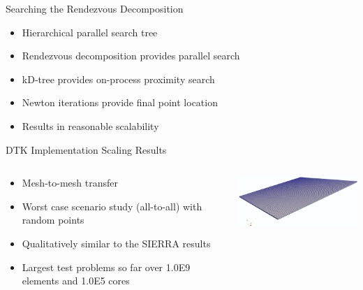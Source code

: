 \documentclass{beamer}
\begin{document}
\begin{frame}{Searching the Rendezvous Decomposition}
  
  \begin{itemize}
  \item Hierarchical parallel search tree
    \medskip
  \item Rendezvous decomposition provides parallel search
    \medskip
  \item kD-tree provides on-process proximity search
    \medskip
  \item Newton iterations provide final point location
    \medskip
  \item Results in reasonable scalability
  \end{itemize}

\end{frame}

\begin{frame}{DTK Implementation Scaling Results}

  \begin{columns}
    
    \begin{column}{0.5\textwidth}
      \begin{itemize}
      \item Mesh-to-mesh transfer
      \item Worst case scenario study (all-to-all) with random points
        \medskip
      \item Qualitatively similar to the SIERRA results
        \medskip
      \item Largest test problems so far over 1.0E9 elements and 1.0E5
        cores
      \end{itemize}
    \end{column}

    \begin{column}{0.5\textwidth}
      \centering
      \includegraphics[width=2.4in]{mesh.png}
    \end{column}

  \end{columns}

\end{frame}
\end{document}
